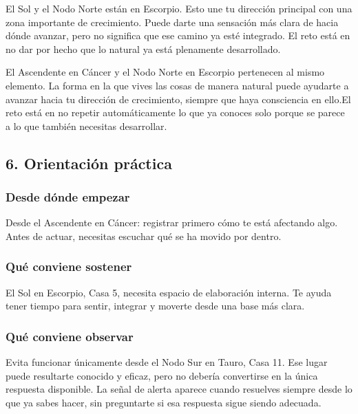 \documentclass[11pt,a4paper]{article}
\begin{document}
El Sol y el Nodo Norte están en Escorpio. Esto une tu dirección principal con una zona importante de crecimiento. Puede darte una sensación más clara de hacia dónde avanzar, pero no significa que ese camino ya esté integrado. El reto está en no dar por hecho que lo natural ya está plenamente desarrollado.

El Ascendente en Cáncer y el Nodo Norte en Escorpio pertenecen al mismo elemento. La forma en la que vives las cosas de manera natural puede ayudarte a avanzar hacia tu dirección de crecimiento, siempre que haya consciencia en ello.El reto está en no repetir automáticamente lo que ya conoces solo porque se parece a lo que también necesitas desarrollar.

\vspace{0.5cm}


\subsection{6. Orientación práctica}

\subsubsection*{Desde dónde empezar}
Desde el Ascendente en Cáncer: registrar primero cómo te está afectando algo. Antes de actuar, necesitas escuchar qué se ha movido por dentro.

\subsubsection*{Qué conviene sostener}
El Sol en Escorpio, Casa 5, necesita espacio de elaboración interna. Te ayuda tener tiempo para sentir, integrar y moverte desde una base más clara.

\subsubsection*{Qué conviene observar}
Evita funcionar únicamente desde el Nodo Sur en Tauro, Casa 11. Ese lugar puede resultarte conocido y eficaz, pero no debería convertirse en la única respuesta disponible. La señal de alerta aparece cuando resuelves siempre desde lo que ya sabes hacer, sin preguntarte si esa respuesta sigue siendo adecuada.
\end{document}
